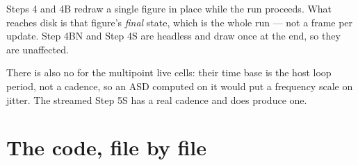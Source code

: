 \begin{openbox}
 Steps 4 and 4B redraw a single figure in place while
the run proceeds. What reaches disk is that figure's \emph{final} state, which is
the whole run --- not a frame per update. Step 4BN and Step 4S are headless and
draw once at the end, so they are unaffected.

There is also no  for the multipoint live cells: their time base is
the host loop period, not a cadence, so an ASD computed on it would put a
frequency scale on jitter. The streamed Step 5S has a real cadence and does
produce one.
\end{openbox}

\section{The code, file by file}
\label{sec:filemap}

